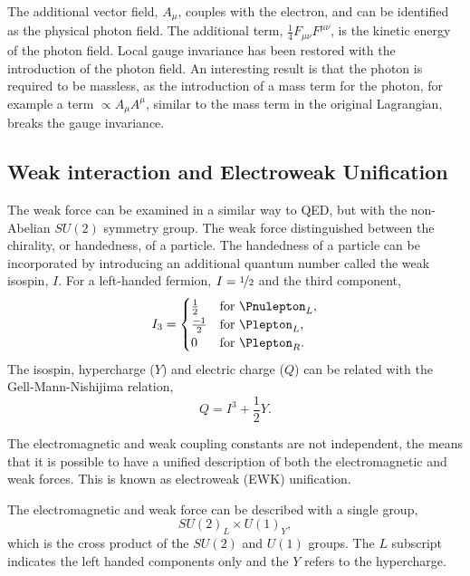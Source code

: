 The additional vector field, $A_{\mu}$, couples with the electron,
 and can be identified as the physical photon field. The additional
term, $\frac{1}{4} F_{\mu\nu} F^{\mu\nu}$, is the kinetic energy of the photon
field. Local gauge invariance has been restored with the introduction of the photon
field. An interesting result is that the photon is required to be massless, as the introduction of
a mass term for the photon, for example a term $\propto A_{\mu}A^{\mu}$,
similar to the mass term in the original Lagrangian, breaks
the gauge invariance.

\subsection{Weak interaction and Electroweak Unification}
\label{sec:EWK}

The weak force can be examined in a similar way to QED, but with the non-Abelian
$SU(2)$ symmetry group. The weak force distinguished between the chirality, or
handedness, of a particle.
The handedness of a particle can be incorporated by introducing an additional
quantum number called the weak isospin, $I$.
For a left-handed fermion, $I=\nicefrac{1}{2}$ and the third component,
\begin{equation}
I_{3} =
  \begin{cases}
    \frac{1}{2}  & \text{for \Pnulepton}_L,  \\
    \frac{-1}{2} & \text{for \Plepton}_L, \\
    0            & \text{for \Plepton}_R.
  \end{cases}
\end{equation}
The isospin, hypercharge ($Y$) and electric charge ($Q$) can be related with the
Gell-Mann-Nishijima relation,
\begin{equation}
Q = I^{3} + \frac{1}{2}Y.
\end{equation}

The electromagnetic and weak coupling constants are not independent, the means that it is
possible to have a unified description of both the electromagnetic and weak
forces. This is known as electroweak (EWK) unification.

The electromagnetic and weak force can be described with a single group,
\begin{equation}
SU(2)_{L} \times U(1)_{Y},
\end{equation}
which is the cross product of the $SU(2)$ and $U(1)$ groups. The $L$ subscript
indicates the left handed components only and the $Y$ refers to the hypercharge.


